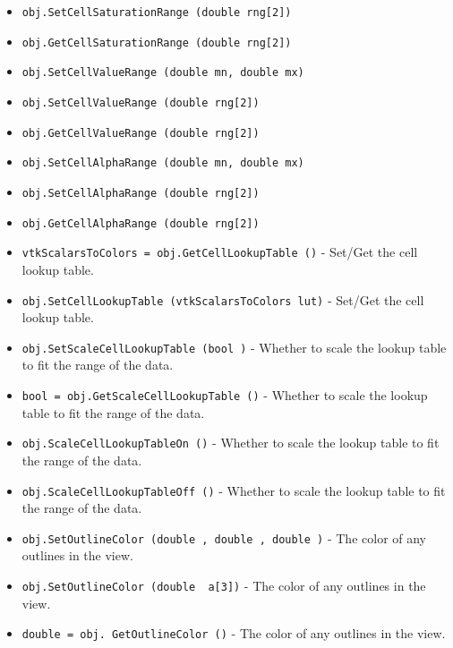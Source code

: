 \begin{itemize}
\item  \verb|obj.SetCellSaturationRange (double rng[2])|

\item  \verb|obj.GetCellSaturationRange (double rng[2])|

\item  \verb|obj.SetCellValueRange (double mn, double mx)|

\item  \verb|obj.SetCellValueRange (double rng[2])|

\item  \verb|obj.GetCellValueRange (double rng[2])|

\item  \verb|obj.SetCellAlphaRange (double mn, double mx)|

\item  \verb|obj.SetCellAlphaRange (double rng[2])|

\item  \verb|obj.GetCellAlphaRange (double rng[2])|

\item  \verb|vtkScalarsToColors = obj.GetCellLookupTable ()| -  Set/Get the cell lookup table.

\item  \verb|obj.SetCellLookupTable (vtkScalarsToColors lut)| -  Set/Get the cell lookup table.

\item  \verb|obj.SetScaleCellLookupTable (bool )| -  Whether to scale the lookup table to fit the range of the data.

\item  \verb|bool = obj.GetScaleCellLookupTable ()| -  Whether to scale the lookup table to fit the range of the data.

\item  \verb|obj.ScaleCellLookupTableOn ()| -  Whether to scale the lookup table to fit the range of the data.

\item  \verb|obj.ScaleCellLookupTableOff ()| -  Whether to scale the lookup table to fit the range of the data.

\item  \verb|obj.SetOutlineColor (double , double , double )| -  The color of any outlines in the view.

\item  \verb|obj.SetOutlineColor (double  a[3])| -  The color of any outlines in the view.

\item  \verb|double = obj. GetOutlineColor ()| -  The color of any outlines in the view.


\end{itemize}
